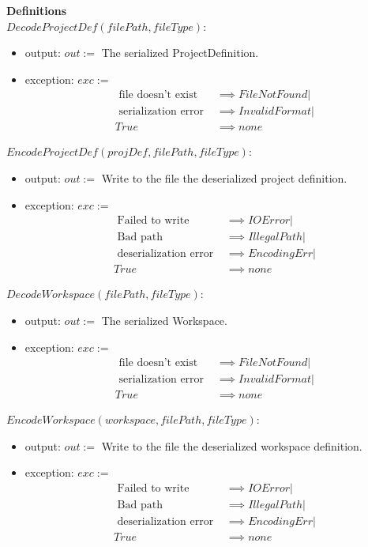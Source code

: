 \documentclass[11pt]{article}
\begin{document}
  \vspace{2em}
  \textbf{Definitions}\\

  $DecodeProjectDef(filePath, fileType):$
  \begin{itemize}
  \item output: $out :=$ The serialized ProjectDefinition.
  \item exception: $exc :=$
    \begin{align*}
      \text{ file doesn't exist } &\implies FileNotFound|\\
      \text{ serialization error } &\implies InvalidFormat|\\
      True &\implies none
    \end{align*}
  \end{itemize}

  \vspace{1em}
  $EncodeProjectDef(projDef, filePath, fileType):$
  \begin{itemize}
  \item output: $out :=$ Write to the file the deserialized project definition.
  \item exception: $exc :=$
    \begin{align*}
      \text{ Failed to write } &\implies IOError|\\
      \text{ Bad path } &\implies IllegalPath|\\
      \text{ deserialization error } &\implies EncodingErr|\\
      True &\implies none
    \end{align*}
  \end{itemize}

  \vspace{1em}
  $DecodeWorkspace(filePath, fileType):$
  \begin{itemize}
  \item output: $out :=$ The serialized Workspace.
  \item exception: $exc :=$
    \begin{align*}
      \text{ file doesn't exist } &\implies FileNotFound|\\
      \text{ serialization error } &\implies InvalidFormat|\\
      True &\implies none
    \end{align*}
  \end{itemize}

  \vspace{1em}
  $EncodeWorkspace(workspace, filePath, fileType):$
  \begin{itemize}
  \item output: $out :=$ Write to the file the deserialized workspace definition.
  \item exception: $exc :=$
    \begin{align*}
      \text{ Failed to write } &\implies IOError|\\
      \text{ Bad path } &\implies IllegalPath|\\
      \text{ deserialization error } &\implies EncodingErr|\\
      True &\implies none
    \end{align*}
  \end{itemize}
\end{document}

